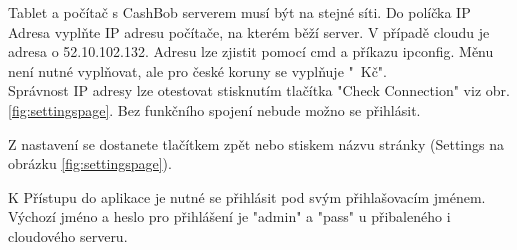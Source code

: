 Tablet a počítač s CashBob serverem musí být na stejné síti.
Do políčka IP Adresa vyplňte IP adresu počítače, na kterém běží server.
V případě cloudu je adresa o 52.10.102.132.
Adresu lze zjistit pomocí cmd a příkazu ipconfig. 
Měnu není nutné vyplňovat, ale pro české koruny se vyplňuje "\ Kč".\\

Správnost IP adresy lze otestovat stisknutím tlačítka "Check Connection" viz obr. \ref{fig:settingspage}.
Bez funkčního spojení nebude možno se přihlásit.  

Z nastavení se dostanete tlačítkem zpět nebo stiskem názvu stránky (Settings na obrázku \ref{fig:settingspage}).

K Přístupu do aplikace je nutné se přihlásit pod svým přihlašovacím jménem.
Výchozí jméno a heslo pro přihlášení je "admin" a "pass" u přibaleného i cloudového serveru. 

